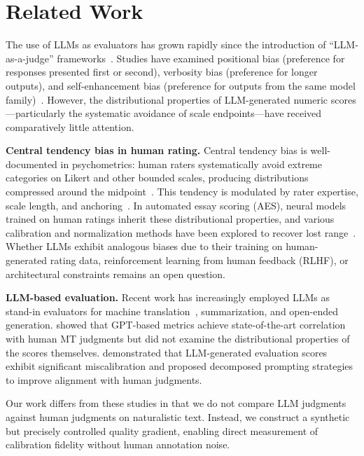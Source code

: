\documentclass[11pt]{article}
\begin{document}
\section{Related Work}
\label{sec:related}

The use of LLMs as evaluators has grown rapidly since the introduction of ``LLM-as-a-judge'' frameworks~\citep{zheng2023judging}. Studies have examined positional bias (preference for responses presented first or second), verbosity bias (preference for longer outputs), and self-enhancement bias (preference for outputs from the same model family)~\citep{wang2023large}. However, the distributional properties of LLM-generated numeric scores---particularly the systematic avoidance of scale endpoints---have received comparatively little attention.

\textbf{Central tendency bias in human rating.} Central tendency bias is well-documented in psychometrics: human raters systematically avoid extreme categories on Likert and other bounded scales, producing distributions compressed around the midpoint~\citep{stevens1971issues}. This tendency is modulated by rater expertise, scale length, and anchoring~\citep{guilford1954psychometric}. In automated essay scoring (AES), neural models trained on human ratings inherit these distributional properties, and various calibration and normalization methods have been explored to recover lost range~\citep{ke2019automated}. Whether LLMs exhibit analogous biases due to their training on human-generated rating data, reinforcement learning from human feedback (RLHF), or architectural constraints remains an open question.

\textbf{LLM-based evaluation.} Recent work has increasingly employed LLMs as stand-in evaluators for machine translation~\citep{kocmi2023large}, summarization, and open-ended generation. \citet{kocmi2023large} showed that GPT-based metrics achieve state-of-the-art correlation with human MT judgments but did not examine the distributional properties of the scores themselves. \citet{liu2023geval} demonstrated that LLM-generated evaluation scores exhibit significant miscalibration and proposed decomposed prompting strategies to improve alignment with human judgments.

Our work differs from these studies in that we do not compare LLM judgments against human judgments on naturalistic text. Instead, we construct a synthetic but precisely controlled quality gradient, enabling direct measurement of calibration fidelity without human annotation noise.
\end{document}
